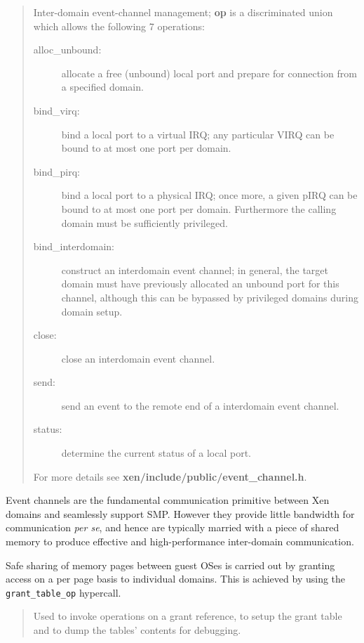 \documentclass[11pt,twoside,final,openright,a4paper]{report}
\newcommand{\hypercall}[1]{\vspace{2mm}{\sf #1}}
\begin{document}
\begin{quote}
\hypercall{event\_channel\_op(evtchn\_op\_t *op)} 

Inter-domain event-channel management; {\bf op} is a discriminated 
union which allows the following 7 operations: 

\begin{description} 

\item[alloc\_unbound:] allocate a free (unbound) local
  port and prepare for connection from a specified domain. 
\item[bind\_virq:] bind a local port to a virtual 
IRQ; any particular VIRQ can be bound to at most one port per domain. 
\item[bind\_pirq:] bind a local port to a physical IRQ;
once more, a given pIRQ can be bound to at most one port per
domain. Furthermore the calling domain must be sufficiently
privileged.
\item[bind\_interdomain:] construct an interdomain event 
channel; in general, the target domain must have previously allocated 
an unbound port for this channel, although this can be bypassed by 
privileged domains during domain setup. 
\item[close:] close an interdomain event channel. 
\item[send:] send an event to the remote end of a 
interdomain event channel. 
\item[status:] determine the current status of a local port. 
\end{description} 

For more details see
{\bf xen/include/public/event\_channel.h}. 

\end{quote} 

Event channels are the fundamental communication primitive between 
Xen domains and seamlessly support SMP. However they provide little
bandwidth for communication {\sl per se}, and hence are typically 
married with a piece of shared memory to produce effective and 
high-performance inter-domain communication. 

Safe sharing of memory pages between guest OSes is carried out by
granting access on a per page basis to individual domains. This is
achieved by using the {\tt grant\_table\_op} hypercall.

\begin{quote}
\hypercall{grant\_table\_op(unsigned int cmd, void *uop, unsigned int count)}

Used to invoke operations on a grant reference, to setup the grant
table and to dump the tables' contents for debugging.

\end{quote} 
\end{document}
